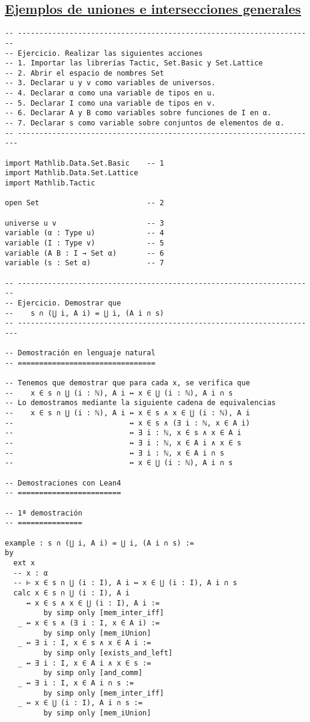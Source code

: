 \subsection{\href{./src/Conjuntos/Ejemplos\_de\_uniones\_e\_intersecciones\_generales.lean}{Ejemplos de uniones e intersecciones generales}}
\label{sec:orge243c68}
\begin{verbatim}
-- ---------------------------------------------------------------------
-- Ejercicio. Realizar las siguientes acciones
-- 1. Importar las librerías Tactic, Set.Basic y Set.Lattice
-- 2. Abrir el espacio de nombres Set
-- 3. Declarar u y v como variables de universos.
-- 4. Declarar α como una variable de tipos en u.
-- 5. Declarar I como una variable de tipos en v.
-- 6. Declarar A y B como variables sobre funciones de I en α.
-- 7. Declarar s como variable sobre conjuntos de elementos de α.
-- ----------------------------------------------------------------------

import Mathlib.Data.Set.Basic    -- 1
import Mathlib.Data.Set.Lattice
import Mathlib.Tactic

open Set                         -- 2

universe u v                     -- 3
variable (α : Type u)            -- 4
variable (I : Type v)            -- 5
variable (A B : I → Set α)       -- 6
variable (s : Set α)             -- 7

-- ---------------------------------------------------------------------
-- Ejercicio. Demostrar que
--    s ∩ (⋃ i, A i) = ⋃ i, (A i ∩ s)
-- ----------------------------------------------------------------------

-- Demostración en lenguaje natural
-- ================================

-- Tenemos que demostrar que para cada x, se verifica que
--    x ∈ s ∩ ⋃ (i : ℕ), A i ↔ x ∈ ⋃ (i : ℕ), A i ∩ s
-- Lo demostramos mediante la siguiente cadena de equivalencias
--    x ∈ s ∩ ⋃ (i : ℕ), A i ↔ x ∈ s ∧ x ∈ ⋃ (i : ℕ), A i
--                           ↔ x ∈ s ∧ (∃ i : ℕ, x ∈ A i)
--                           ↔ ∃ i : ℕ, x ∈ s ∧ x ∈ A i
--                           ↔ ∃ i : ℕ, x ∈ A i ∧ x ∈ s
--                           ↔ ∃ i : ℕ, x ∈ A i ∩ s
--                           ↔ x ∈ ⋃ (i : ℕ), A i ∩ s

-- Demostraciones con Lean4
-- ========================

-- 1ª demostración
-- ===============

example : s ∩ (⋃ i, A i) = ⋃ i, (A i ∩ s) :=
by
  ext x
  -- x : α
  -- ⊢ x ∈ s ∩ ⋃ (i : I), A i ↔ x ∈ ⋃ (i : I), A i ∩ s
  calc x ∈ s ∩ ⋃ (i : I), A i
     ↔ x ∈ s ∧ x ∈ ⋃ (i : I), A i :=
         by simp only [mem_inter_iff]
   _ ↔ x ∈ s ∧ (∃ i : I, x ∈ A i) :=
         by simp only [mem_iUnion]
   _ ↔ ∃ i : I, x ∈ s ∧ x ∈ A i :=
         by simp only [exists_and_left]
   _ ↔ ∃ i : I, x ∈ A i ∧ x ∈ s :=
         by simp only [and_comm]
   _ ↔ ∃ i : I, x ∈ A i ∩ s :=
         by simp only [mem_inter_iff]
   _ ↔ x ∈ ⋃ (i : I), A i ∩ s :=
         by simp only [mem_iUnion]


\end{verbatim}
